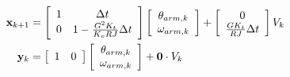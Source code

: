 \begin{align}
  \mathbf{x}_{k+1} &= \left[
  \begin{array}{cc}
    1 & \Delta t \\
    0 & 1 - \frac{G^2 K_t}{K_v RJ} \Delta t
  \end{array}
  \right] \left[
  \begin{array}{c}
    \theta_{arm,k} \\
    \omega_{arm,k}
  \end{array}
  \right] + \left[
  \begin{array}{c}
    0 \\
    \frac{G K_t}{RJ} \Delta t
  \end{array}
  \right] V_k \\
  \mathbf{y}_k &= \left[
  \begin{array}{cc}
    1 & 0
  \end{array}
  \right] \left[
  \begin{array}{c}
    \theta_{arm,k} \\
    \omega_{arm,k}
  \end{array}
  \right] + \mathbf{0} \cdot V_k
\end{align}
